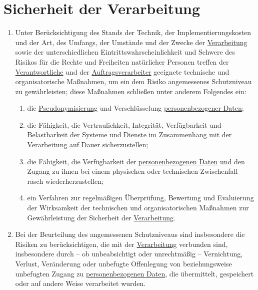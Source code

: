 \chapter{Sicherheit der Verarbeitung}
\label{ch:32}


\begin{enumerate}

  \item Unter Berücksichtigung des Stands der Technik, der Implementierungskosten und der Art, des Umfangs, der Umstände
   und der Zwecke der \hyperref[itm:04-2]{Verarbeitung} sowie der unterschiedlichen Eintrittswahrscheinlichkeit und
   Schwere des Risikos für die Rechte und Freiheiten natürlicher Personen treffen der \hyperref[itm:04-7]
   {Verantwortliche} und der \hyperref[itm:04-8]{Auftragsverarbeiter} geeignete technische und organisatorische
   Maßnahmen, um ein dem Risiko angemessenes Schutzniveau zu gewährleisten; diese Maßnahmen schließen unter anderem
   Folgendes ein:
  \label{itm:32-1}

  \begin{enumerate}
  
    \item die \hyperref[itm:04-5]{Pseudonymisierung} und Verschlüsselung \hyperref[itm:04-1]{personenbezogener Daten};
    \label{itm:32-1a}

    \item die Fähigkeit, die Vertraulichkeit, Integrität, Verfügbarkeit und Belastbarkeit der Systeme und Dienste im
     Zusammenhang mit der \hyperref[itm:04-2]{Verarbeitung} auf Dauer sicherzustellen;
    \label{itm:32-1b}

    \item die Fähigkeit, die Verfügbarkeit der \hyperref[itm:04-1]{personenbezogenen Daten} und den Zugang zu ihnen bei
     einem physischen oder technischen Zwischenfall rasch wiederherzustellen;
    \label{itm:32-1c}

    \item ein Verfahren zur regelmäßigen Überprüfung, Bewertung und Evaluierung der Wirksamkeit der technischen und
     organisatorischen Maßnahmen zur Gewährleistung der Sicherheit der \hyperref[itm:04-2]{Verarbeitung}.
    \label{itm:32-1d}

  \end{enumerate}

  \item Bei der Beurteilung des angemessenen Schutzniveaus sind insbesondere die Risiken zu berücksichtigen, die mit
   der
   \hyperref[itm:04-2]{Verarbeitung} verbunden sind, insbesondere durch -- ob unbeabsichtigt oder unrechtmäßig --
    Vernichtung, Verlust, Veränderung oder unbefugte Offenlegung von beziehungsweise unbefugten Zugang zu \hyperref
    [itm:04-1]{personenbezogenen Daten}, die übermittelt, gespeichert oder auf andere Weise verarbeitet wurden.
  \label{itm:32-2}


\end{enumerate}
